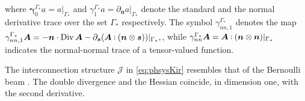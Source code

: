 where $\bm\gamma_{0}^{\Gamma_*}a = a\vert_{\Gamma_*}$ and  $\gamma_{1}^{\Gamma_*}a = \partial_{\bm{n}} a \vert_{\Gamma_*}$ denote the standard and the normal derivative trace over the set $\Gamma_*$ respectively. The symbol $\gamma_{nn, 1}^{\Gamma_*}$ denotes the map $\gamma_{nn, 1}^{\Gamma_*}\bm{A} = -\bm{n} \cdot \Div \bm{A} - \partial_{\bm{s}} (\bm{A} \cddot (\bm{n} \otimes \bm{s}))\vert_{\Gamma_*},$, while $\gamma_{nn}^{\Gamma_*}\bm{A} = \bm{A} \cddot (\bm{n} \otimes \bm{n})\vert_{\Gamma_*}$ indicates the normal-normal trace of a tensor-valued function.

\begin{remark}
	The interconnection structure $\mathcal{J}$ in \eqref{eq:phsysKir} resembles that of the Bernoulli beam \cite{cardoso2017}. The double divergence and the Hessian coincide, in dimension one, with the second derivative.
\end{remark}

